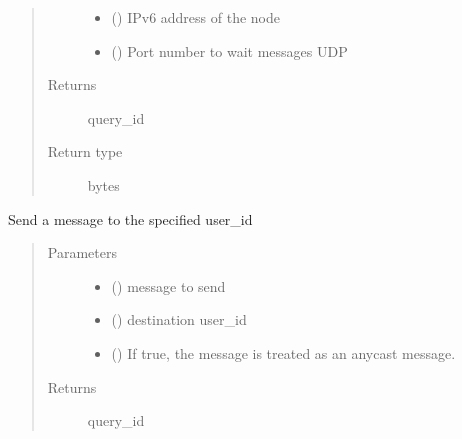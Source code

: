 \documentclass[letterpaper,10pt,english]{sphinxmanual}
\begin{document}
\begin{fulllineitems}
\begin{fulllineitems}
\begin{quote}
\begin{description}
\begin{itemize}
\item {} 
 () \textendash{} IPv6 address of the node

\item {} 
 () \textendash{} Port number to wait messages UDP

\end{itemize}

\item[{Returns}] \leavevmode
query\_id

\item[{Return type}] \leavevmode
bytes

\end{description}\end{quote}

\end{fulllineitems}


\begin{fulllineitems}
\label{\detokenize{bbc1.core.bbc_app:bbc1.core.bbc_app.BBcAppClient.send_message}}
Send a message to the specified user\_id
\begin{quote}\begin{description}
\item[{Parameters}] \leavevmode\begin{itemize}
\item {} 
 () \textendash{} message to send

\item {} 
 () \textendash{} destination user\_id

\item {} 
 () \textendash{} If true, the message is treated as an anycast message.

\end{itemize}

\item[{Returns}] \leavevmode
query\_id


\end{description}
\end{quote}
\end{fulllineitems}
\end{fulllineitems}
\end{document}
